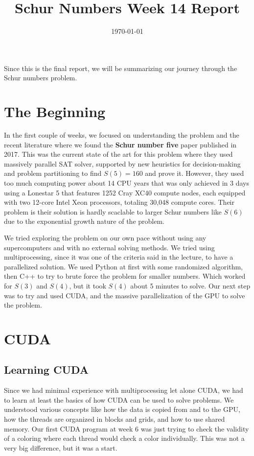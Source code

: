 \documentclass[12pt]{article}
\begin{document}
\title{Schur Numbers Week 14 Report}
\date{\today}

\tableofcontents
\newpage
\maketitle
Since this is the final report, we will be summarizing our journey through the Schur numbers problem. 

\section{The Beginning}
In the first couple of weeks, we focused on understanding the problem and the recent literature where we found the \textbf{Schur number five} paper published in 2017. This was the current state of the art for this problem where they used  massively parallel SAT solver, supported by new heuristics for decision-making and problem partitioning to find $S(5) = 160$ and prove it. However, they used too much computing power about 14 CPU years that was only achieved in 3 days using a Lonestar 5 that features 1252 Cray XC40 compute nodes, each equipped with two 12-core Intel Xeon processors, totaling 30,048 compute cores. Their problem is their solution is hardly scaclable to larger Schur numbers like $S(6)$ due to the exponential growth nature of the problem.

We tried exploring the problem on our own pace without using any supercomputers and with no external solving methods. We tried using multiprocessing, since it was one of the criteria said in the lecture, to have a parallelized solution. We used Python at first with some randomized algorithm, then C++ to try to brute force the problem for smaller numbers. Which worked for $S(3)$ and $S(4)$, but it took $S(4)$ about 5 minutes to solve. Our next step was to try and used CUDA, and the massive parallelization of the GPU to solve the problem.    \section{CUDA}
\subsection{Learning CUDA}
Since we had minimal experience with multiprocessing let alone CUDA, we had to learn at least the basics of how CUDA can be used to solve problems. We understood various concepts like how the data is copied from and to the GPU, how the threads are organized in blocks and grids, and how to use shared memory. Our first CUDA program at week 6 was just trying to check the validity of a coloring where each thread would check a color individually. This was not a very big difference, but it was a start. 
\end{document}
